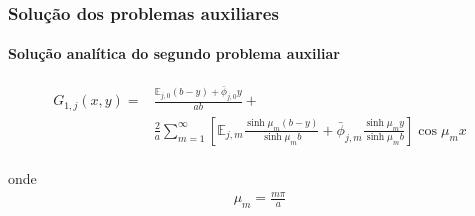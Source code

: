 \documentclass{beamer}
\begin{document}
\begin{frame}
	\frametitle{Solução dos problemas auxiliares}
	\framesubtitle{Solução analítica do segundo problema auxiliar}
	
	\begin{alertblock}{}
	\begin{align*}	
		G_{1, j}(x, y) = & \frac{\mathbb{E}_{j,0}(b - y) + \bar{\phi}_{j,0}y}{ab} + \nonumber \\
		&\frac{2}{a}\sum_{m=1}^\infty\left[\mathbb{E}_{j,m}\frac{\sinh\mu_m (b - y)}{\sinh\mu_m b} + \bar{\phi}_{j, m}\frac{\sinh\mu_m y}{\sinh\mu_m b}\right]\cos\mu_m x \\
		\end{align*}
	\end{alertblock}	
	
	onde
	\begin{align*}
	\mu_m = \frac{m \pi}{a}
	\end{align*}
	
\end{frame}
\end{document}
